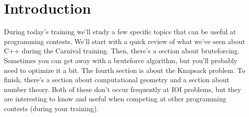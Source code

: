 \section{Introduction}
During today's training we'll study a few specific topics that can be useful at programming contests.
We'll start with a quick review of what we've seen about C++ during the Carnival training.
Then, there's a section about bruteforcing. Sometimes you can get away with a bruteforce algorithm, but you'll probably need to optimize it a bit.
The fourth section is about the Knapsack problem.
To finish, there's a section about computational geometry and a section about number theory. 
Both of these don't occur frequently at IOI problems, but they are interesting to know and useful when competing at other programming contests (during your training).
